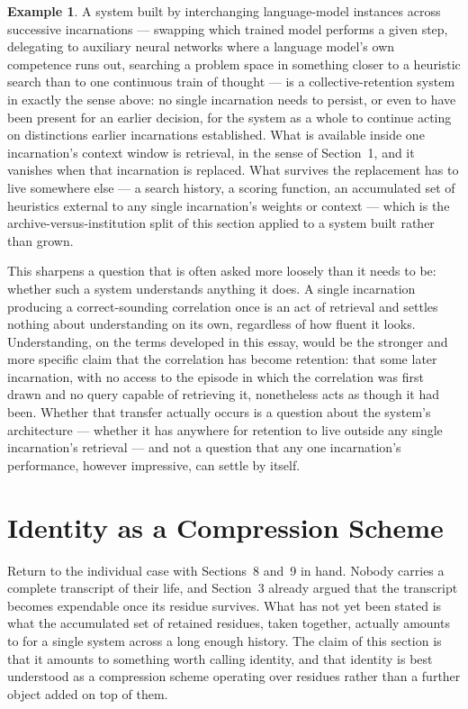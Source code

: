 \documentclass[11pt]{amsart}
\theoremstyle{plain}
\theoremstyle{definition}
\newtheorem{example}[theorem]{Example}
\theoremstyle{remark}
\begin{document}
\begin{example}
\label{ex:incarnations}
A system built by interchanging language-model instances across
successive incarnations --- swapping which trained model performs a
given step, delegating to auxiliary neural networks where a language
model's own competence runs out, searching a problem space in something
closer to a heuristic search than to one continuous train of thought
--- is a collective-retention system in exactly the sense above: no
single incarnation needs to persist, or even to have been present for
an earlier decision, for the system as a whole to continue acting on
distinctions earlier incarnations established. What is available inside
one incarnation's context window is retrieval, in the sense of
Section~1, and it vanishes when that incarnation is replaced. What
survives the replacement has to live somewhere else --- a search
history, a scoring function, an accumulated set of heuristics external
to any single incarnation's weights or context --- which is the
archive-versus-institution split of this section applied to a system
built rather than grown.

This sharpens a question that is often asked more loosely than it
needs to be: whether such a system understands anything it does. A
single incarnation producing a correct-sounding correlation once is an
act of retrieval and settles nothing about understanding on its own,
regardless of how fluent it looks. Understanding, on the terms
developed in this essay, would be the stronger and more specific claim
that the correlation has become retention: that some later incarnation,
with no access to the episode in which the correlation was first drawn
and no query capable of retrieving it, nonetheless acts as though it
had been. Whether that transfer actually occurs is a question about the
system's architecture --- whether it has anywhere for retention to
live outside any single incarnation's retrieval --- and not a question
that any one incarnation's performance, however impressive, can settle
by itself.
\end{example}

\section{Identity as a Compression Scheme}

Return to the individual case with Sections~8 and~9 in hand. Nobody
carries a complete transcript of their life, and Section~3 already
argued that the transcript becomes expendable once its residue
survives. What has not yet been stated is what the accumulated set of
retained residues, taken together, actually amounts to for a single
system across a long enough history. The claim of this section is that
it amounts to something worth calling identity, and that identity is
best understood as a compression scheme operating over residues rather
than a further object added on top of them.
\end{document}
